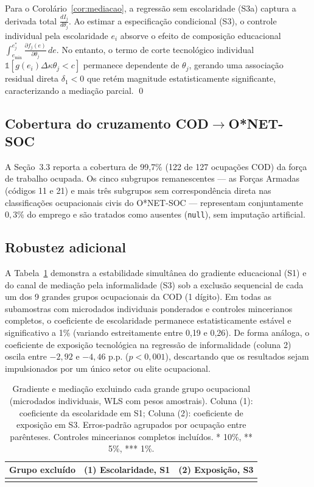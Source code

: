 Para o Corolário~\ref{cor:mediacao}, a regressão sem escolaridade (S3a) captura a derivada total $\frac{d I_j}{d \theta_j}$. Ao estimar a especificação condicional (S3), o controle individual pela escolaridade $e_i$ absorve o efeito de composição educacional $\int_{e_{\min}}^{e^*_j} \frac{\partial f_j(e)}{\partial \theta_j} \, de$. No entanto, o termo de corte tecnológico individual $\mathbb{1}[g(e_i)\Delta\kappa\theta_j < c]$ permanece dependente de $\theta_j$, gerando uma associação residual direta $\delta_1 < 0$ que retém magnitude estatisticamente significante, caracterizando a mediação parcial. \qed

\subsection{Cobertura do cruzamento \texorpdfstring{COD$\to$O*NET-SOC}{COD para O*NET-SOC}}

A Seção~3.3 reporta a cobertura de 99{,}7\% (122 de 127 ocupações COD) da força de trabalho ocupada. Os cinco subgrupos remanescentes --- as Forças Armadas (códigos 11 e 21) e mais três subgrupos sem correspondência direta nas classificações ocupacionais civis do O*NET-SOC --- representam conjuntamente $0{,}3\%$ do emprego e são tratados como ausentes (\texttt{null}), sem imputação artificial.

\subsection{Robustez adicional}
\label{ap:robustez}

A Tabela~\ref{tab:robustezgrupos} demonstra a estabilidade simultânea do gradiente educacional (S1) e do canal de mediação pela informalidade (S3) sob a exclusão sequencial de cada um dos 9 grandes grupos ocupacionais da COD (1 dígito). Em todas as subamostras com microdados individuais ponderados e controles mincerianos completos, o coeficiente de escolaridade permanece estatisticamente estável e significativo a 1\% (variando estreitamente entre 0{,}19 e 0{,}26). De forma análoga, o coeficiente de exposição tecnológica na regressão de informalidade (coluna 2) oscila entre $-2{,}92$ e $-4{,}46$ p.p. ($p < 0{,}001$), descartando que os resultados sejam impulsionados por um único setor ou elite ocupacional.

\begin{table}[htbp]
\centering
\small
\caption{Gradiente e mediação excluindo cada grande grupo ocupacional (microdados individuais, WLS com pesos amostrais). Coluna (1): coeficiente da escolaridade em S1; Coluna (2): coeficiente de exposição em S3. Erros-padrão agrupados por ocupação entre parênteses. Controles mincerianos completos incluídos. * 10\%, ** 5\%, *** 1\%.}
\label{tab:robustezgrupos}
\begin{tabular}{lcc}
\toprule
Grupo excluído & (1) Escolaridade, S1 & (2) Exposição, S3 \\
\midrule
 \\
\bottomrule
\end{tabular}
\end{table}
